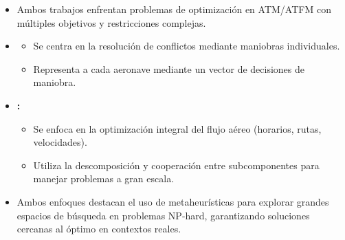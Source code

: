\begin{frame}{\parencite{mateos_multiobjective_2016} }{}
    \begin{itemize}
        \item Ambos trabajos enfrentan problemas de optimización en ATM/ATFM con múltiples objetivos y restricciones complejas.
        \item \textbf{\parencite{mateos_multiobjective_2016}}
              \begin{itemize}
                  \item Se centra en la resolución de conflictos mediante maniobras individuales.
                  \item Representa a cada aeronave mediante un vector de decisiones de maniobra.
              \end{itemize}
        \item \textbf{\parencite{Guo_2024_CCDF}:}
              \begin{itemize}
                  \item Se enfoca en la optimización integral del flujo aéreo (horarios, rutas, velocidades).
                  \item Utiliza la descomposición y cooperación entre subcomponentes para manejar problemas a gran escala.
              \end{itemize}
        \item Ambos enfoques destacan el uso de metaheurísticas para explorar grandes espacios de búsqueda en problemas NP-hard, garantizando soluciones cercanas al óptimo en contextos reales.
    \end{itemize}
\end{frame}

\begin{frame}{\parencite{lavandier_selective_2021} }{}

\end{frame}




\thispagestyle{plain}
\begin{frame}
    \tiny
    \printbibliography


\end{frame}



